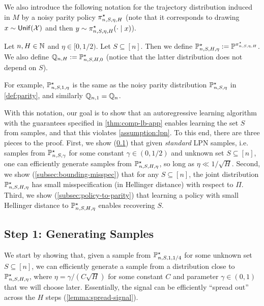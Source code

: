 We also introduce the following notation for the trajectory distribution induced in $M$ by a noisy parity policy $\pi^{\star}_{n,S,\eta,H}$ (note that it corresponds to drawing $x \sim \mathsf{Unif}(\mathcal{X})$ and then $y \sim \pi^{\star}_{n,S,\eta,H}(\cdot\mid{}x)$).


\begin{definition}
Let $n,H \in \mathbb{N}$ and $\eta \in [0,1/2)$. Let $S \subseteq [n]$. Then we define $\mathbb{P}^\star_{n,S,H,\eta} := \mathbb{P}^{\pi^\star_{n,S,\eta,H}}$. We also define $\mathbb{Q}_{n,H} := \mathbb{P}^\star_{n,S,H,0}$ (notice that the latter distribution does not depend on $S$).
\end{definition}

For example, $\mathbb{P}^\star_{n,S,1,\eta}$ is the same as the noisy parity distribution $\mathbb{P}^\star_{n,S,\eta}$ in \cref{def:parity}, and similarly $\mathbb{Q}_{n,1} = \mathbb{Q}_n$. \loose

With this notation, our goal is to show that an autoregressive learning algorithm with the guarantees specified in \cref{thm:comp-lb-app} enables learning the set $S$ from samples, and that this violates \cref{assumption:lpn}. To this end, there are three pieces to the proof. First, we show (\cref{subsec:generating-samples}) that given \emph{standard} LPN samples, i.e. samples from $\mathbb{P}^\star_{n,S,\gamma}$ for some constant $\gamma \in (0,1/2)$ and unknown set $S \subseteq [n]$, one can efficiently generate samples from $\mathbb{P}^\star_{n,S,H,\eta}$, so long as $\eta \ll 1/\sqrt{H}$. Second, we show (\cref{subsec:bounding-misspec}) that for any $S \subseteq [n]$, the joint distribution $\mathbb{P}^\star_{n,S,H,\eta}$ has small misspecification (in Hellinger distance) with respect to $\Pi$. Third, we show
(\cref{subsec:policy-to-parity}) that learning a policy with small Hellinger distance to $\mathbb{P}^\star_{n,S,H,\eta}$ enables recovering $S$.

\subsection{Step 1: Generating Samples}\label{subsec:generating-samples}


We start by showing that, given a sample from $\mathbb{P}^\star_{n,S,1,1/4}$ for some unknown set $S \subseteq [n]$, we can efficiently generate a sample from a distribution close to $\mathbb{P}^\star_{n,S,H,\eta}$, where $\eta = \gamma/(C\sqrt{H})$ for some constant $C$ and parameter $\gamma \in (0,1)$ that we will choose later. Essentially, the signal can be efficiently ``spread out'' across the $H$ steps (\cref{lemma:spread-signal}).

